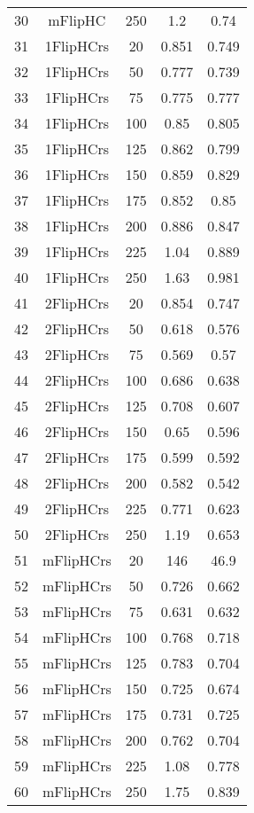 \begin{table}[hbtp]
\begin{tabular}{|ccccc|}
  30 & mFlipHC &  250 &  1.2 & 0.74 \\
  31 & 1FlipHCrs &   20 & 0.851 & 0.749 \\
  32 & 1FlipHCrs &   50 & 0.777 & 0.739 \\
  33 & 1FlipHCrs &   75 & 0.775 & 0.777 \\
  34 & 1FlipHCrs &  100 & 0.85 & 0.805 \\
  35 & 1FlipHCrs &  125 & 0.862 & 0.799 \\
  36 & 1FlipHCrs &  150 & 0.859 & 0.829 \\
  37 & 1FlipHCrs &  175 & 0.852 & 0.85 \\
  38 & 1FlipHCrs &  200 & 0.886 & 0.847 \\
  39 & 1FlipHCrs &  225 & 1.04 & 0.889 \\
  40 & 1FlipHCrs &  250 & 1.63 & 0.981 \\
  41 & 2FlipHCrs &   20 & 0.854 & 0.747 \\
  42 & 2FlipHCrs &   50 & 0.618 & 0.576 \\
  43 & 2FlipHCrs &   75 & 0.569 & 0.57 \\
  44 & 2FlipHCrs &  100 & 0.686 & 0.638 \\
  45 & 2FlipHCrs &  125 & 0.708 & 0.607 \\
  46 & 2FlipHCrs &  150 & 0.65 & 0.596 \\
  47 & 2FlipHCrs &  175 & 0.599 & 0.592 \\
  48 & 2FlipHCrs &  200 & 0.582 & 0.542 \\
  49 & 2FlipHCrs &  225 & 0.771 & 0.623 \\
  50 & 2FlipHCrs &  250 & 1.19 & 0.653 \\
  51 & mFlipHCrs &   20 &  146 & 46.9 \\
  52 & mFlipHCrs &   50 & 0.726 & 0.662 \\
  53 & mFlipHCrs &   75 & 0.631 & 0.632 \\
  54 & mFlipHCrs &  100 & 0.768 & 0.718 \\
  55 & mFlipHCrs &  125 & 0.783 & 0.704 \\
  56 & mFlipHCrs &  150 & 0.725 & 0.674 \\
  57 & mFlipHCrs &  175 & 0.731 & 0.725 \\
  58 & mFlipHCrs &  200 & 0.762 & 0.704 \\
  59 & mFlipHCrs &  225 & 1.08 & 0.778 \\
  60 & mFlipHCrs &  250 & 1.75 & 0.839 \\
\hline
\end{tabular}
\end{table}
